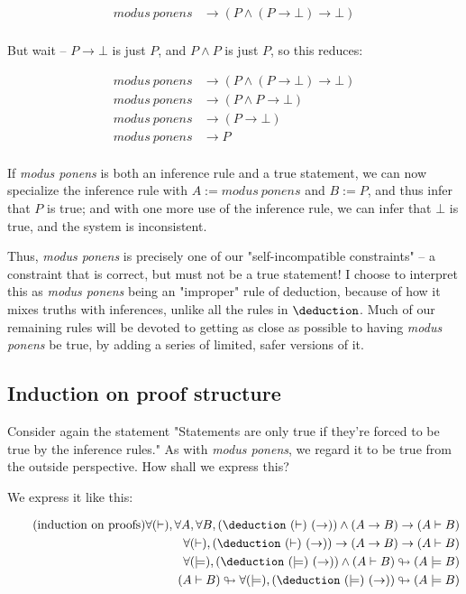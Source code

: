 \documentclass{article}
\begin{document}
  \begin{align*}
    modus\ ponens &\to (P \wedge (P \to \bot) \to \bot)\\
  \end{align*}
  
  But wait – $P \to \bot$ is just $P$, and $P \wedge P$ is just $P$, so this reduces:
  
  \begin{align*}
    modus\ ponens &\to (P \wedge (P \to \bot) \to \bot)\\
    modus\ ponens &\to (P \wedge P \to \bot)\\
    modus\ ponens &\to (P \to \bot)\\
    modus\ ponens &\to P\\
  \end{align*}
  
  If \emph{modus ponens} is both an inference rule and a true statement, we can now specialize the inference rule with $A := modus\ ponens$ and $B := P$, and thus infer that $P$ is true; and with one more use of the inference rule, we can infer that $\bot$ is true, and the system is inconsistent.
  
  Thus, \emph{modus ponens} is precisely one of our "self-incompatible constraints" – a constraint that is correct, but must not be a true statement! I choose to interpret this as \emph{modus ponens} being an "improper" rule of deduction, because of how it mixes truths with inferences, unlike all the rules in $\deduction$. Much of our remaining rules will be devoted to getting as close as possible to having \emph{modus ponens} be true, by adding a series of limited, safer versions of it.
  
  
    
  
  \subsection{Induction on proof structure}
  
  Consider again the statement "Statements are only true if they're forced to be true by the inference rules." As with \emph{modus ponens}, we regard it to be true from the outside perspective. How shall we express this?
  
  We express it like this:
  
  \begin{align*}
    \tag{induction on proofs}\label{inp}
    \forall (\vdash), \forall A,\forall B,  (\deduction\ (\vdash)\ (\to)) \wedge (A \to B) \to (A \vdash B)\\
    \forall (\vdash), (\deduction\ (\vdash)\ (\to)) \to (A \to B) \to (A \vdash B)\\
    \forall (\models), (\deduction\ (\models)\ (\to)) \wedge (A \vdash B) \looparrowright (A \models B)\\
    (A \vdash B) \looparrowright \forall (\models), (\deduction\ (\models)\ (\to)) \looparrowright (A \models B)\\
  \end{align*}
  
\end{document}
